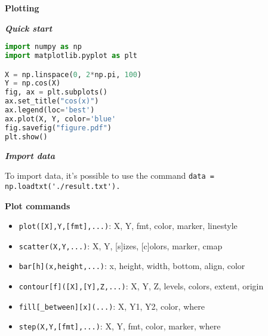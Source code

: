 \documentclass[fontsize=8pt, a4paper, landscape, fleqn]{scrartcl}
\renewcommand{\subsection}[1]{%
    \noindent\colorbox{subsectioncolor}{%
        \parbox{\dimexpr\columnwidth-2\fboxsep}{\color{white}\textbf{#1}}}%
    \vspace{0.5mm}%
}
\renewcommand{\subsubsection}[1]{%
    \noindent\textbf{\textit{\color{subsectioncolor}#1}}%
    \vspace{1mm}%
}
\begin{document}
\begin{multicols*}{3}[\raggedcolumns]
    \subsection{Plotting}
    \subsubsection{Quick start}
        \begin{lstlisting}[language=python, breaklines]
import numpy as np
import matplotlib.pyplot as plt

X = np.linspace(0, 2*np.pi, 100)
Y = np.cos(X)
fig, ax = plt.subplots()
ax.set_title("cos(x)")
ax.legend(loc='best')
ax.plot(X, Y, color='blue'
fig.savefig("figure.pdf")
plt.show()\end{lstlisting}


    \subsubsection{Import data}
    To import data, it's possible to use the command \lstinline{data = np.loadtxt('./result.txt').}
    
    \subsection{Plot commands}
    \begin{itemize}
        \item \lstinline{plot([X],Y,[fmt],...)}: X, Y, fmt, color, marker, linestyle 
        \item \lstinline{scatter(X,Y,...)}: X, Y, [s]izes, [c]olors, marker, cmap
        \item \lstinline{bar[h](x,height,...)}: x, height, width, bottom, align, color
        \item \lstinline{contour[f]([X],[Y],Z,...)}: X, Y, Z, levels, colors, extent, origin
        \item \lstinline{fill[_between][x](...)}: X, Y1, Y2, color, where
        \item \lstinline{step(X,Y,[fmt],...)}: X, Y, fmt, color, marker, where
    \end{itemize}
    

\end{multicols*}
\end{document}

